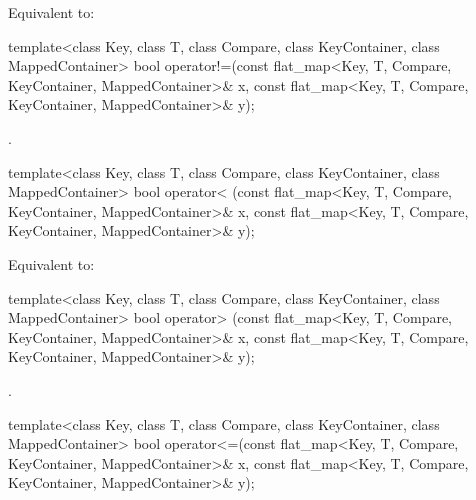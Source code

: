\begin{codeblock}
\begin{codeblock}
\begin{codeblock}
\begin{addedblock}
\begin{itemdescr}
\pnum
\effects Equivalent to:
\end{itemdescr}

%
\begin{itemdecl}
template<class Key, class T, class Compare, class KeyContainer, class MappedContainer>
  bool operator!=(const flat_map<Key, T, Compare, KeyContainer, MappedContainer>& x,
                  const flat_map<Key, T, Compare, KeyContainer, MappedContainer>& y);
\end{itemdecl}

\begin{itemdescr}
\pnum \returns {}.
\end{itemdescr}

%
\begin{itemdecl}
template<class Key, class T, class Compare, class KeyContainer, class MappedContainer>
  bool operator< (const flat_map<Key, T, Compare, KeyContainer, MappedContainer>& x,
                  const flat_map<Key, T, Compare, KeyContainer, MappedContainer>& y);
\end{itemdecl}

\begin{itemdescr}
\pnum
\effects Equivalent to:
\end{itemdescr}

%
\begin{itemdecl}
template<class Key, class T, class Compare, class KeyContainer, class MappedContainer>
  bool operator> (const flat_map<Key, T, Compare, KeyContainer, MappedContainer>& x,
                  const flat_map<Key, T, Compare, KeyContainer, MappedContainer>& y);
\end{itemdecl}

\begin{itemdescr}
\pnum \returns {}.
\end{itemdescr}

%
\begin{itemdecl}
template<class Key, class T, class Compare, class KeyContainer, class MappedContainer>
  bool operator<=(const flat_map<Key, T, Compare, KeyContainer, MappedContainer>& x,
                  const flat_map<Key, T, Compare, KeyContainer, MappedContainer>& y);
\end{itemdecl}


\end{addedblock}
\end{codeblock}
\end{codeblock}
\end{codeblock}
